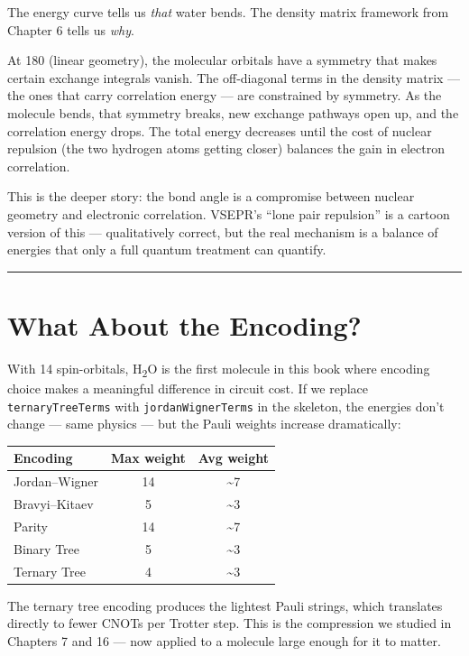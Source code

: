 \documentclass[
  11pt,
  oneside]{book}
\begin{document}
The energy curve tells us \emph{that} water bends. The density matrix
framework from Chapter 6 tells us \emph{why}.

At 180\textdegree{} (linear geometry), the molecular orbitals have a symmetry that
makes certain exchange integrals vanish. The off-diagonal terms in the
density matrix --- the ones that carry correlation energy --- are
constrained by symmetry. As the molecule bends, that symmetry breaks,
new exchange pathways open up, and the correlation energy drops. The
total energy decreases until the cost of nuclear repulsion (the two
hydrogen atoms getting closer) balances the gain in electron
correlation.

This is the deeper story: the bond angle is a compromise between nuclear
geometry and electronic correlation. VSEPR's ``lone pair repulsion'' is
a cartoon version of this --- qualitatively correct, but the real
mechanism is a balance of energies that only a full quantum treatment
can quantify.

\begin{center}\rule{0.5\linewidth}{0.5pt}\end{center}

\section{What About the Encoding?}\label{what-about-the-encoding}

With 14 spin-orbitals, H\textsubscript{2}O is the first molecule in this book where
encoding choice makes a meaningful difference in circuit cost. If we
replace \texttt{ternaryTreeTerms} with \texttt{jordanWignerTerms} in the
skeleton, the energies don't change --- same physics --- but the Pauli
weights increase dramatically:

\begin{longtable}[]{@{}lcc@{}}
\toprule\noalign{}
Encoding & Max weight & Avg weight \\
\midrule\noalign{}
\endhead
\bottomrule\noalign{}
\endlastfoot
Jordan--Wigner & 14 & \textasciitilde7 \\
Bravyi--Kitaev & 5 & \textasciitilde3 \\
Parity & 14 & \textasciitilde7 \\
Binary Tree & 5 & \textasciitilde3 \\
Ternary Tree & 4 & \textasciitilde3 \\
\end{longtable}

The ternary tree encoding produces the lightest Pauli strings, which
translates directly to fewer CNOTs per Trotter step. This is the
compression we studied in Chapters 7 and 16 --- now applied to a
molecule large enough for it to matter.
\end{document}
